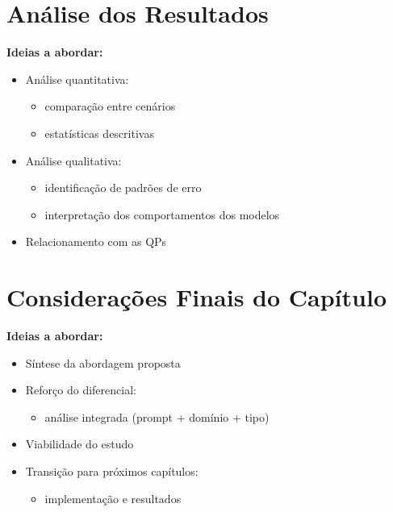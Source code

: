 \section{Análise dos Resultados}
\label{subsec:analise}

\textbf{Ideias a abordar:}
\begin{itemize}
    \item Análise quantitativa:
    \begin{itemize}
        \item comparação entre cenários
        \item estatísticas descritivas
    \end{itemize}
    \item Análise qualitativa:
    \begin{itemize}
        \item identificação de padrões de erro
        \item interpretação dos comportamentos dos modelos
    \end{itemize}
    \item Relacionamento com as QPs
\end{itemize}



\section{Considerações Finais do Capítulo}
\label{subsec:proposta_final}

\textbf{Ideias a abordar:}
\begin{itemize}
    \item Síntese da abordagem proposta
    \item Reforço do diferencial:
    \begin{itemize}
        \item análise integrada (prompt + domínio + tipo)
    \end{itemize}
    \item Viabilidade do estudo
    \item Transição para próximos capítulos:
    \begin{itemize}
        \item implementação e resultados
    \end{itemize}
\end{itemize}